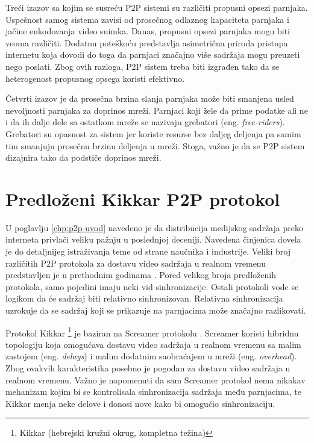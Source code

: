 \documentclass[12pt,oneside]{memoir}
\begin{document}
Treći izazov sa kojim se susreću P2P sistemi su različiti propusni opsezi parnjaka. Uspešnost samog sistema zavisi od prosečnog odlaznog kapaciteta parnjaka i jačine enkodovanja video snimka. Danas, propusni opsezi parnjaka mogu biti veoma različiti. Dodatnu poteškoću predstavlja asimetrična priroda pristupa internetu koja dovodi do toga da parnjaci značajno više sadržaja mogu preuzeti nego poslati. Zbog ovih razloga, P2P sistem treba biti izgrađen tako da se heterogenost propusnog opsega koristi efektivno.

Četvrti izazov je da prosečna brzina slanja parnjaka može biti smanjena usled nevoljnosti parnjaka za doprinos mreži. Parnjaci koji žele da prime podatke ali ne i da ih dalje dele sa ostatkom mreže se nazivaju grebatori (eng. \textit{free-riders}). Grebatori su opasnost za sistem jer koriste resurse bez daljeg deljenja pa samim tim smanjuju prosečnu brzinu deljenja u mreži. Stoga, važno je da se P2P sistem dizajnira tako da podstiče doprinos mreži.



\chapter{Predloženi Kikkar P2P protokol}
\label{chp:p2p-protokol}
U poglavlju \ref{chp:p2p-uvod} navedeno je da distribucija medijskog sadržaja preko interneta privlači veliku pažnju u poslednjoj deceniji. Navedena činjenica dovela je do detaljnijeg istraživanja teme od strane naučnika i industrije. Veliki broj različitih P2P protokola za dostavu video sadržaja u realnom vremenu predstavljen je u prethodnim godinama \cite{Zhang:2012:SPL:2365364.2365643}. Pored velikog broja predloženih protokola, samo pojedini imaju neki vid sinhronizacije. Ostali protokoli vode se logikom da će sadržaj biti relativno sinhronizovan. Relativna sinhronizacija uzrokuje da se sadržaj koji se prikazuje na parnjacima može značajno razlikovati.


Protokol Kikkar \footnote{Kikkar (hebrejski kružni okrug, kompletna težina)} je baziran na Screamer protokolu \cite{cohenP2P}. Screamer koristi hibridnu topologiju koja omogućava dostavu video sadržaja u realnom vremenu sa malim zastojem (eng. \textit{delays}) i malim dodatnim saobraćajem u mreži (eng. \textit{overhead}). Zbog ovakvih karakteristika posebno je pogodan za dostavu video sadržaja u realnom vremenu. Važno je napomenuti da sam Screamer protokol nema nikakav mehanizam kojim bi se kontrolisala sinhronizacija sadržaja među parnjacima, te Kikkar menja neke delove i donosi nove kako bi omogućio sinhronizaciju.
\end{document}
